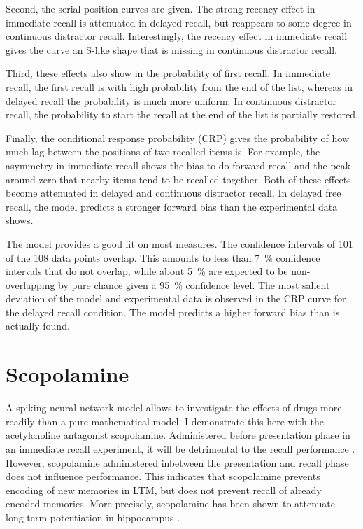 Second, the serial position curves are given.
The strong recency effect in immediate recall is attenuated in delayed recall, but reappears to some degree in continuous distractor recall.
Interestingly, the recency effect in immediate recall gives the curve an S-like shape that is missing in continuous distractor recall.

Third, these effects also show in the probability of first recall.
In immediate recall, the first recall is with high probability from the end of the list, whereas in delayed recall the probability is much more uniform.
In continuous distractor recall, the probability to start the recall at the end of the list is partially restored.

Finally, the conditional response probability (CRP) gives the probability of how much lag between the positions of two recalled items is.
For example, the asymmetry in immediate recall shows the bias to do forward recall and the peak around zero that nearby items tend to be recalled together.
Both of these effects become attenuated in delayed and continuous distractor recall.
In delayed free recall, the model predicts a stronger forward bias than the experimental data shows.

The model provides a good fit on most measures.
The confidence intervals of \num{101} of the \num{108} data points overlap.
This amounts to less than \SI{7}{\percent} confidence intervals that do not overlap, while about \SI{5}{\percent} are expected to be non-overlapping by pure chance given a \SI{95}{\percent} confidence level.
The most salient deviation of the model and experimental data is observed in the CRP curve for the delayed recall condition.
The model predicts a higher forward bias than is actually found.


\section{Scopolamine}
A spiking neural network model allows to investigate the effects of drugs more readily than a pure mathematical model.
I demonstrate this here with the acetylcholine antagonist scopolamine.
Administered before presentation phase in an immediate recall experiment, it will be detrimental to the recall performance \parencite{ghoneim1975}.
However, scopolamine administered inbetween the presentation and recall phase does not influence performance.
This indicates that scopolamine prevents encoding of new memories in LTM, but does not prevent recall of already encoded memories.
More precisely, scopolamine has been shown to attenuate long-term potentiation in hippocampus \parencite{leung2003,ito1988,hirotsu1989-1}.

